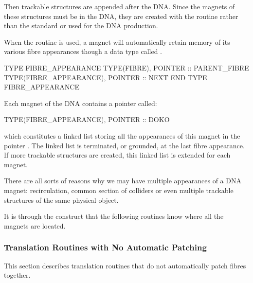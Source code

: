 %
Then trackable structures are appended after the DNA. Since the magnets
of these structures must be in the DNA, they are created with the
 routine rather than the standard 
or  used for the DNA production.

%
When the  routine is used, a magnet will automatically
retain memory of its various fibre appearances though a data type called
.

\begin{ptccode}
TYPE FIBRE_APPEARANCE
  TYPE(FIBRE), POINTER :: PARENT_FIBRE
  TYPE(FIBRE_APPEARANCE), POINTER :: NEXT
END TYPE FIBRE_APPEARANCE
\end{ptccode}

%
Each magnet of the DNA contains a pointer called:

\begin{ptccode}
TYPE(FIBRE_APPEARANCE), POINTER :: DOKO
\end{ptccode}

which constitutes a linked list storing all the appearances of this
magnet in the pointer . The linked list is terminated,
or grounded, at the last fibre appearance. If more trackable structures
are created, this linked list is extended for each magnet.

There are all sorts of reasons why we may have multiple appearances
of a DNA magnet: recirculation, common section of colliders or even
multiple trackable structures of the same physical object.

It is through the  construct that the following routines know
where all the magnets are located.


\subsubsection{Translation Routines with No Automatic Patching}

%
This section describes translation routines that do not automatically patch 
fibres together.


